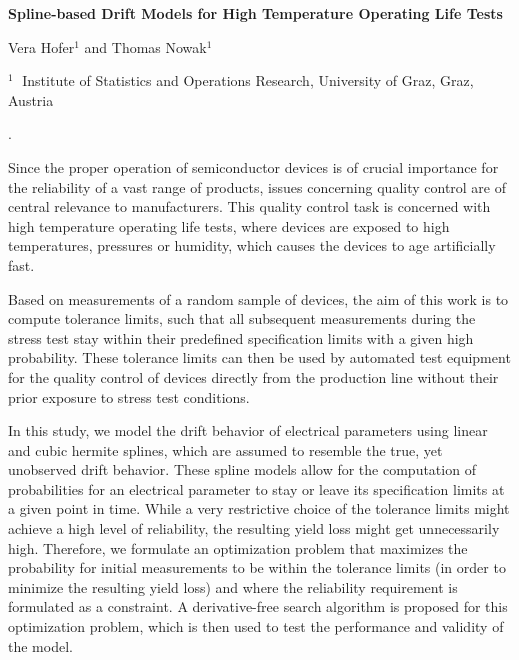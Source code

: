 \documentclass[12pt]{article}
\begin{document}
\begin{flushleft}


{\LARGE\bf Spline-based Drift Models for High Temperature Operating Life Tests}


\vspace{1.0cm}

Vera Hofer$^1$ and Thomas Nowak$^1$

\begin{description}

\item $^1 \;$ Institute of Statistics and Operations Research, University of Graz, Graz, Austria

\end{description}

\end{flushleft}


\vspace{0.75cm}

. 

Since the proper operation of semiconductor devices is of crucial importance for the reliability of a vast range of products, issues concerning quality control are of central relevance to manufacturers. This quality control task is concerned with high temperature operating life tests, where devices are exposed to high temperatures, pressures or humidity, which causes the devices to age artificially fast.

Based on measurements of a random sample of devices, the aim of this work is to compute tolerance limits, such that all subsequent measurements during the stress test stay within their predefined specification limits with a given high probability. These tolerance limits can then be used by automated test equipment for the quality control of devices directly from the production line without their prior exposure to stress test conditions.

In this study, we model the drift behavior of electrical parameters using linear and cubic hermite splines, which are assumed to resemble the true, yet unobserved drift behavior. These spline models allow for the computation of probabilities for an electrical parameter to stay or leave its specification limits at a given point in time. While a very restrictive choice of the tolerance limits might achieve a high level of reliability, the resulting yield loss might get unnecessarily high. Therefore, we formulate an optimization problem that maximizes the probability for initial measurements to be within the tolerance limits (in order to minimize the resulting yield loss) and where the reliability requirement is formulated as a constraint. A derivative-free search algorithm is proposed for this optimization problem, which is then used to test the performance and validity of the model. 
\end{document}
